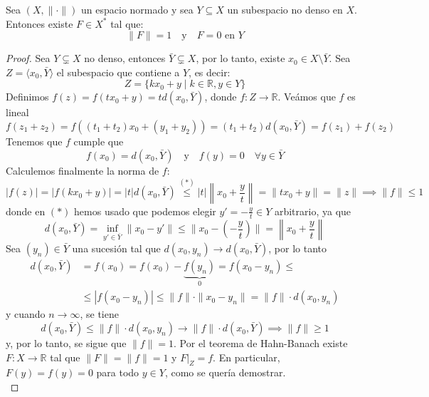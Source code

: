 \begin{coro}\label{coro:hahn-banach-analitico-no-denso}
    Sea $(X, \|\cdot\|)$ un espacio normado y sea $Y \subseteq X$ un subespacio no denso en $X$. Entonces existe $F \in X^*$ tal que:
    \begin{equation*}
        \|F\| = 1 \quad \text{y} \quad F = 0 \text{ en } Y
    \end{equation*}

\begin{proof}
    Sea $Y \subsetneq X$ no denso, entonces $\bar{Y} \subsetneq X$, por lo tanto, existe $x_0 \in X \setminus \bar{Y}$. Sea $Z = \langle x_0, \bar{Y} \rangle$ el subespacio que contiene a $Y$, es decir:
    \begin{equation*}
        Z = \{ k x_0 + y \mid k \in \mathbb{R}, y \in Y \}
    \end{equation*}
    Definimos $f(z) = f(t x_0 + y) = t d(x_0, \bar{Y})$, donde $f: Z \to \mathbb{R}$. Veámos que $f$ es lineal
    \begin{equation*}
        f(z_1 + z_2) = f((t_1 + t_2)x_0 + (y_1 + y_2)) = (t_1 + t_2) d(x_0, \bar{Y}) = f(z_1) + f(z_2)
    \end{equation*}
    Tenemos que $f$ cumple que 
    \begin{equation*}
        f(x_0) = d(x_0, \bar{Y}) \quad \text{y} \quad f(y) = 0 \quad \forall y \in \bar{Y}
    \end{equation*}
    Calculemos finalmente la norma de $f$:
    \begin{equation*}
        |f(z)| = |f(k x_0 + y)| = |t| d(x_0, \bar{Y}) \overset{(*)}{\leq} |t| \left\| x_0 + \frac{y}{t} \right\| = \|t x_0 + y\| = \|z\| \implies \|f\| \leq 1
    \end{equation*}
    donde en $(*)$ hemos usado que podemos elegir $y'=-\frac{y}{t} \in Y$ arbitrario, ya que 
    \begin{equation*}
        d(x_0, \bar{Y}) = \inf_{y' \in \bar{Y}} \|x_0 - y'\| \leq \|x_0 - (-\frac{y}{t})\| = \left\| x_0 + \frac{y}{t} \right\|
    \end{equation*}
    Sea $(y_n) \in \bar{Y}$ una sucesión tal que $d(x_0, y_n) \to d(x_0, \bar{Y})$, por lo tanto
    \begin{align*}
        d(x_0, \bar{Y}) &= f(x_0) = f(x_0) - \underbrace{f(y_n)}_{0} = f(x_0 - y_n) \leq \\
        &\leq |f(x_0 - y_n)| \leq \|f\| \cdot \|x_0 - y_n\| = \|f\| \cdot d(x_0, y_n)
    \end{align*}
    y cuando $n \to \infty$, se tiene 
    \begin{equation*}
        d(x_0, \bar{Y}) \leq \|f\| \cdot d(x_0, y_n) \to \|f\| \cdot d(x_0, \bar{Y}) \implies \|f\| \geq 1
    \end{equation*}
    y, por lo tanto, se sigue que $\|f\| = 1$. Por el teorema de Hahn-Banach existe $F: X \to \mathbb{R}$ tal que $\|F\| = \|f\|=1$ y $F|_Z = f$. En particular, $F(y) = f(y) = 0$ para todo $y \in Y$, como se quería demostrar. \\
\end{proof}
\end{coro}

